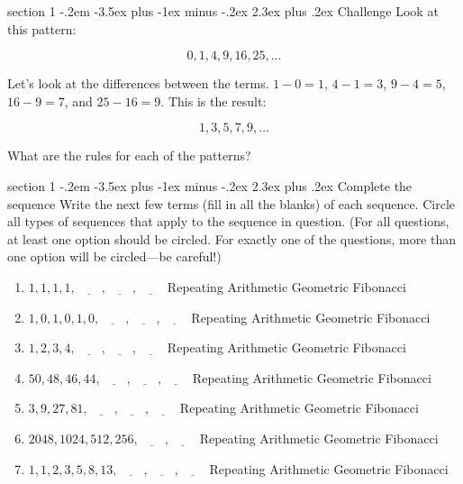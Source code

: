 \documentclass[12pt,letterpaper]{article}
\makeatletter
\newenvironment{problem}{\@startsection
       {section}
       {1}
       {-.2em}
       {-3.5ex plus -1ex minus -.2ex}
       {2.3ex plus .2ex}
       {\pagebreak[3]
       \large\bf\noindent{Problem }
       }
       }
\makeatother
\begin{document}
\begin{problem}{Challenge}
 Look at this pattern:

 \[
  0, 1, 4, 9, 16, 25, \ldots
 \]

 Let's look at the differences between the terms. $1-0=1$, $4-1=3$, $9-4=5$, $16-9=7$, and $25-16=9$.
 This is the result:

 \[
  1, 3, 5, 7, 9, \ldots
 \]

 What are the rules for each of the patterns?
\end{problem}

\begin{problem}{Complete the sequence}
 Write the next few terms (fill in all the blanks) of each sequence. Circle all types of sequences
 that apply to the sequence in question. (For all questions, at least one option should be circled.
 For exactly one of the questions, more than one option will be circled---be careful!)

 \begin{enumerate}
  \item $1, 1, 1, 1, \underline{\hspace{2em}}, \underline{\hspace{2em}}, \underline{\hspace{2em}}$
  \hfill Repeating Arithmetic Geometric Fibonacci
  \item $1, 0, 1, 0, 1, 0, \underline{\hspace{2em}}, \underline{\hspace{2em}},
  \underline{\hspace{2em}}$
  \hfill Repeating Arithmetic Geometric Fibonacci
  \item $1, 2, 3, 4, \underline{\hspace{2em}}, \underline{\hspace{2em}},
  \underline{\hspace{2em}}$
  \hfill Repeating Arithmetic Geometric Fibonacci
  \item $50, 48, 46, 44, \underline{\hspace{2em}}, \underline{\hspace{2em}},
  \underline{\hspace{2em}}$
  \hfill Repeating Arithmetic Geometric Fibonacci
  \item $3, 9, 27, 81, \underline{\hspace{2em}}, \underline{\hspace{2em}},
  \underline{\hspace{2em}}$
  \hfill Repeating Arithmetic Geometric Fibonacci
  \item $2048, 1024, 512, 256, \underline{\hspace{2em}},
  \underline{\hspace{2em}}$
  \hfill Repeating Arithmetic Geometric Fibonacci
  \item $1, 1, 2, 3, 5, 8, 13, \underline{\hspace{2em}},
  \underline{\hspace{2em}}, \underline{\hspace{2em}}$
  \hfill Repeating Arithmetic Geometric Fibonacci
 \end{enumerate}
\end{problem}
\end{document}
